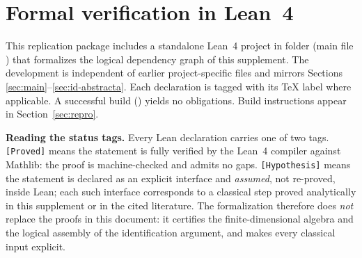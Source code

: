 \documentclass[ecta,nameyear,final,supplement]{econsocart}
\numberwithin{equation}{section}
\numberwithin{table}{section}
\theoremstyle{definition}
\begin{document}
\section{Formal verification in Lean~4}
\label{sec:lean-formalization}

\begin{sloppypar}
\noindent
This replication package includes a standalone Lean~4 project in folder
 (main file ) that
formalizes the logical dependency graph of this supplement. The development is
independent of earlier project-specific files and mirrors Sections
\ref{sec:main}--\ref{sec:id-abstracta}. Each declaration is tagged with its TeX
label where applicable. A successful build () yields no
 obligations. Build instructions appear in Section~\ref{sec:repro}.
\end{sloppypar}

\medskip
\noindent\textbf{Reading the status tags.}
Every Lean declaration carries one of two tags. \texttt{[Proved]} means the
statement is fully verified by the Lean~4 compiler against Mathlib: the proof
is machine-checked and admits no gaps. \texttt{[Hypothesis]} means the
statement is declared as an explicit interface and \emph{assumed}, not
re-proved, inside Lean; each such interface corresponds to a classical step
proved analytically in this supplement or in the cited literature. The
formalization therefore does \emph{not} replace the proofs in this document:
it certifies the finite-dimensional algebra and the logical assembly of the
identification argument, and makes every classical input explicit.
\end{document}
